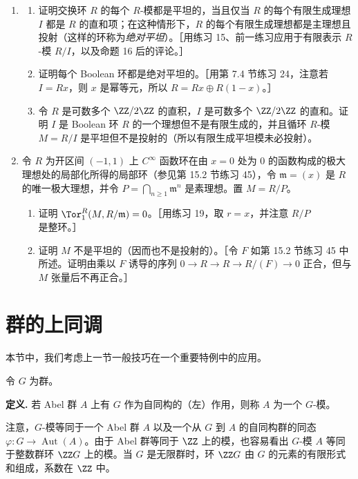 \begin{enumerate}[label=\arabic*.,resume]
  \item \begin{enumerate}[label=(\alph*)]
    \item 证明交换环 $R$ 的每个 $R$-模都是平坦的，当且仅当 $R$ 的每个有限生成理想 $I$ 都是 $R$ 的直和项；在这种情形下，$R$ 的每个有限生成理想都是主理想且投射（这样的环称为\emph{绝对平坦}）。［用练习 15、前一练习应用于有限表示 $R$-模 $R/I$，以及命题 16 后的评论。］
    \item 证明每个 Boolean 环都是绝对平坦的。［用第 7.4 节练习 24，注意若 $I=Rx$，则 $x$ 是幂等元，所以 $R=Rx\oplus R(1-x)$。］
    \item 令 $R$ 是可数多个 $\ZZ/2\ZZ$ 的直积，$I$ 是可数多个 $\ZZ/2\ZZ$ 的直和。证明 $I$ 是 Boolean 环 $R$ 的一个理想但不是有限生成的，并且循环 $R$-模 $M=R/I$ 是平坦但不是投射的（所以有限生成平坦模未必投射）。
  \end{enumerate}

  \item 令 $R$ 为开区间 $(-1,1)$ 上 $C^\infty$ 函数环在由 $x=0$ 处为 $0$ 的函数构成的极大理想处的局部化所得的局部环（参见第 15.2 节练习 45），令 $\mathfrak m=(x)$ 是 $R$ 的唯一极大理想，并令 $P=\bigcap_{n\geq1}\mathfrak m^n$ 是素理想。置 $M=R/P$。
  \begin{enumerate}[label=(\alph*)]
    \item 证明 $\Tor_1^R(M,R/\mathfrak m)=0$。［用练习 19，取 $r=x$，并注意 $R/P$ 是整环。］
    \item 证明 $M$ 不是平坦的（因而也不是投射的）。［令 $F$ 如第 15.2 节练习 45 中所述。证明由乘以 $F$ 诱导的序列 $0\to R\to R\to R/(F)\to0$ 正合，但与 $M$ 张量后不再正合。］
  \end{enumerate}
\end{enumerate}

\section{群的上同调}

本节中，我们考虑上一节一般技巧在一个重要特例中的应用。

令 $G$ 为群。

\noindent\textbf{定义.} 若 Abel 群 $A$ 上有 $G$ 作为自同构的（左）作用，则称 $A$ 为一个 $G$-模。

注意，$G$-模等同于一个 Abel 群 $A$ 以及一个从 $G$ 到 $A$ 的自同构群的同态 $\varphi:G\to\operatorname{Aut}(A)$。由于 Abel 群等同于 $\ZZ$ 上的模，也容易看出 $G$-模 $A$ 等同于整数群环 $\ZZ G$ 上的模。当 $G$ 是无限群时，环 $\ZZ G$ 由 $G$ 的元素的有限形式和组成，系数在 $\ZZ$ 中。

